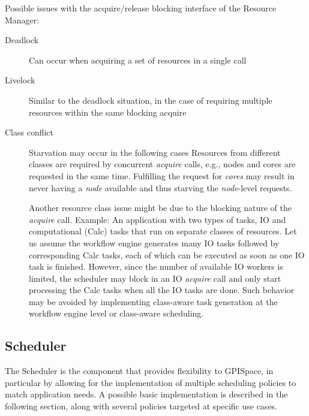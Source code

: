 \documentclass[10pt]{article}
\newcommand{\sched}{Scheduler\xspace}
\begin{document}
Possible issues with the acquire/release blocking interface of the Resource
Manager:
\begin{description}
    \item [Deadlock] Can occur when acquiring a set of resources in a single
    call 
    \item [Livelock] Similar to the deadlock situation, in the case of requiring
    multiple resources within the same blocking acquire
    \item [Class conflict] Starvation may occur in the following cases
    Resources from different classes are required by concurrent
    \emph{acquire} calls, e.g., nodes and cores are requested in the same time.
    Fulfilling the request for \emph{cores} may result in never having a \emph{node}
    available and thus starving the \emph{node}-level requests.
    
    Another resource class issue might be due to the blocking nature of the
    \emph{acquire} call. 
    Example:
    An application with two types of tasks, IO and computational (Calc)
    tasks that run on separate classes of resources. Let us assume the workflow
    engine generates many IO tasks followed by corresponding Calc tasks, each of
    which can be executed as soon as one IO task is finished.
    However, since the number of available IO workers is limited, the
    scheduler may block in an IO \emph{acquire} call and only start processing the
    Calc tasks when all the IO tasks are done.
    Such behavior may be avoided by implementing class-aware task
    generation at the workflow engine level or class-aware scheduling.
    
\end{description}


\subsection{Scheduler}
The \sched is the component that provides flexibility to GPISpace, in particular
by allowing for the implementation of multiple scheduling policies to match
application needs.
A possible basic implementation is described in the following section, along
with several policies targeted at specific use cases. 
\end{document}
